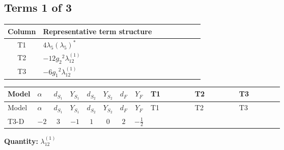 \documentclass[8pt]{article}
\begin{document}
\begin{landscape}
\subsection*{Terms 1 of 3}
\begin{center}
\begin{tabular}{@{}c >{\raggedright\arraybackslash}p{0.82\linewidth}@{}}
\toprule
Column & Representative term structure \\
\midrule
T1 & \(\displaystyle 4 {\lambda_5} \left({\lambda_5}\right)^{*}\) \\
\midrule
T2 & \(\displaystyle -12 {g_2}^2 {\lambda_{12}^{(1)}}\) \\
\midrule
T3 & \(\displaystyle -6 {g_1}^2 {\lambda_{12}^{(1)}}\) \\
\midrule
\bottomrule
\end{tabular}
\end{center}
\smallskip
\tiny
\begin{longtable}{@{}llcccccc >{\raggedright\arraybackslash}p{0.21\linewidth} >{\raggedright\arraybackslash}p{0.21\linewidth} >{\raggedright\arraybackslash}p{0.21\linewidth}@{}}
\toprule
Model & $\alpha$ & $d_{S_1}$ & $Y_{S_1}$ & $d_{S_2}$ & $Y_{S_2}$ & $d_F$ & $Y_F$ & T1 & T2 & T3 \\
\midrule
\endfirsthead
\toprule
Model & $\alpha$ & $d_{S_1}$ & $Y_{S_1}$ & $d_{S_2}$ & $Y_{S_2}$ & $d_F$ & $Y_F$ & T1 & T2 & T3 \\
\midrule
\endhead
T3-D & $-2$ & $3$ & $-1$ & $1$ & $0$ & $2$ & $-\frac{1}{2}$ & \scriptsize\adjustbox{max width=\linewidth}{$\begin{gathered} 4 {\lambda_5} \left({\lambda_5}\right)^{*}\end{gathered}$} & \scriptsize\adjustbox{max width=\linewidth}{$\begin{gathered} -12 {g_2}^2 {\lambda_{12}^{(1)}}\end{gathered}$} & \scriptsize\adjustbox{max width=\linewidth}{$\begin{gathered} -6 {g_1}^2 {\lambda_{12}^{(1)}}\end{gathered}$} \\
\midrule
\bottomrule
\end{longtable}
\clearpage
\noindent\textbf{Quantity: }$\lambda_{12}^{(1)}$\par\smallskip

\end{landscape}
\end{document}
